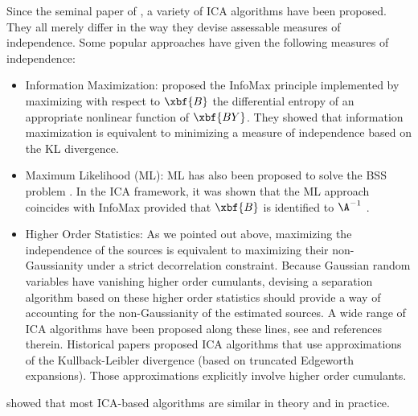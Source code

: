 Since the seminal paper of  \citet{ica:comon94}, a variety of ICA algorithms have been proposed. They all merely differ in the way they devise assessable measures of independence. 
Some popular approaches have given the following measures of independence:
\begin{itemize}
\item{{Information Maximization:}} \citet{ica:infomax,ica:nadal} proposed the InfoMax principle implemented by maximizing with respect to $\xbf{B}$ the differential entropy of an appropriate nonlinear function of $\xbf{BY}$. They showed that information maximization is equivalent to minimizing a measure of independence based on the KL divergence.
\item{{Maximum Likelihood (ML):}} ML has also been proposed to solve the BSS problem \citep{ica:cardo-ml,ica:pearlparra,ica:phamgarratjutten}. In the ICA framework, it was shown that the ML approach coincides with InfoMax provided that $\xbf{B}$ is identified to $\A^{-1}$ \citep{ica:cardo-ml}.
\item{{Higher Order Statistics:}} As we pointed out above, maximizing the independence of the sources is equivalent to maximizing their non-Gaussianity under a strict decorrelation constraint. Because Gaussian random variables have vanishing higher order cumulants, devising a separation algorithm based on these higher order statistics should provide a way of accounting for the non-Gaussianity of the estimated sources. A wide range of ICA algorithms have been proposed along these lines, see \citep{miki:Aapo,ica:sobi,ica:jade} and references therein. Historical papers \citep{ica:comon94} proposed ICA algorithms that use approximations of the Kullback-Leibler divergence (based on truncated Edgeworth expansions). Those approximations explicitly involve higher order cumulants.
\end{itemize}
\citet{lee98unifying} showed that most ICA-based algorithms are similar in theory and in practice. 

